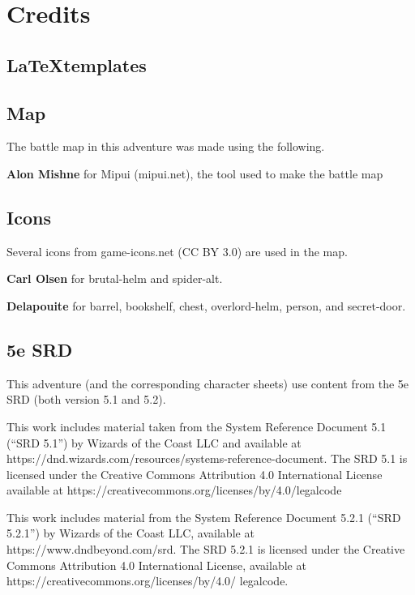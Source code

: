 \onecolumn
\section{Credits}

\subsection{\LaTeX  templates}


\subsection {Map}
The battle map in this adventure was made using the following.

\textbf{Alon Mishne} for Mipui (mipui.net), the tool used to make the battle map

\subsection {Icons}

Several icons from game-icons.net (CC BY 3.0) are used in the map.

\textbf{Carl Olsen} for brutal-helm and spider-alt.

\textbf{Delapouite} for barrel, bookshelf, chest, overlord-helm, person, and secret-door.

\subsection {5e SRD}

This adventure (and the corresponding character sheets) use content from the 5e SRD (both version 5.1 and 5.2).

This work includes material taken from the System Reference Document 5.1 (“SRD 5.1”) by Wizards of
the Coast LLC and available at https://dnd.wizards.com/resources/systems-reference-document. The
SRD 5.1 is licensed under the Creative Commons Attribution 4.0 International License available at
https://creativecommons.org/licenses/by/4.0/legalcode

This work includes material from the System Reference Document 5.2.1 (“SRD 5.2.1”) by Wizards of the
Coast LLC, available at https://www.dndbeyond.com/srd. The SRD 5.2.1 is licensed under the Creative
Commons Attribution 4.0 International License, available at https://creativecommons.org/licenses/by/4.0/
legalcode.

